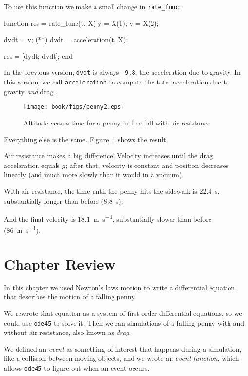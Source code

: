 To use this function we make a small change in \lstinline{rate_func}:

\begin{code}
function res = rate_func(t, X)
    y = X(1);      
    v = X(2);      
    
    dydt = v;
(**)    dvdt = acceleration(t, X);   %

    res = [dydt; dvdt];
end

\end{code}

In the previous version, \lstinline{dvdt} is always \lstinline{-9.8}, the acceleration due to gravity.
In this version, we call \lstinline{acceleration} to compute the total acceleration due to gravity {\em and} drag .

\begin{figure}[ht]
\centerline{\texttt{[image: book/figs/penny2.eps]}}
\caption{Altitude versus time for a penny in free fall with air resistance}
\label{fig:penny2}
\end{figure}

Everything else is the same.  Figure~\ref{fig:penny2} shows the result. 

Air resistance makes a big difference!  Velocity increases until
the drag acceleration equals $g$; after that, velocity is constant and position decreases linearly (and much more slowly than it would in a vacuum).

With air resistance, the time until the penny hits the sidewalk is \SI{22.4}{\second}, substantially longer than before (\SI{8.8}{\second}).

And the final velocity is \SI{18.1}{\meter \per \second}, substantially slower than before (\SI{86}{\meter \per \second}).

\section{Chapter Review}

In this chapter we used Newton's laws motion to write a differential equation that describes the motion of a falling penny.  

We rewrote that equation as a system of first-order differential equations, so we could use \lstinline{ode45} to solve it.  Then we ran simulations of a falling penny with and without air resistance, also known as {\em drag}.

We defined an {\em event} as something of interest that happens during a simulation, like a collision between moving objects, and we wrote an {\em event function}, which allows \lstinline{ode45} to figure out when an event occurs.

